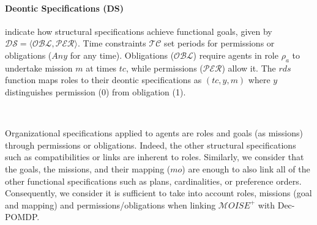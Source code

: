\documentclass[sigconf,anonymous]{aamas}
\begin{document}
\noindent \paragraph{\textbf{Deontic Specifications (DS)}} indicate how structural specifications achieve functional goals, given by $\mathcal{DS} = \langle \mathcal{OBL}, \mathcal{PER} \rangle$. Time constraints $\mathcal{TC}$ set periods for permissions or obligations ($Any$ for any time). Obligations ($\mathcal{OBL}$) require agents in role $\rho_a$ to undertake mission $m$ at times $tc$, while permissions ($\mathcal{PER}$) allow it. The $rds$ function maps roles to their deontic specifications as $(tc, y, m)$ where $y$ distinguishes permission (0) from obligation (1).

\

\noindent Organizational specifications applied to agents are roles and goals (as missions) through permissions or obligations. Indeed, the other structural specifications such as compatibilities or links are inherent to roles. Similarly, we consider that the goals, the missions, and their mapping ($mo$) are enough to also link all of the other functional specifications such as plans, cardinalities, or preference orders.
Consequently, we consider it is sufficient to take into account roles, missions (goal and mapping) and permissions/obligations when linking $\mathcal{M}OISE^+$ with Dec-POMDP. 
\end{document}
